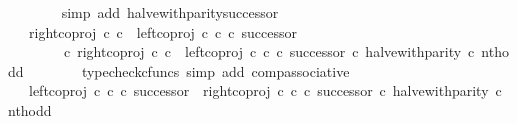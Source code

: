 \begin{isabellebody}
\ \ \ \ \ \ \isamarkupfalse%
\ {\isacharparenleft}{\kern0pt}simp\ add{\isacharcolon}{\kern0pt}\ halve{\isacharunderscore}{\kern0pt}with{\isacharunderscore}{\kern0pt}parity{\isacharunderscore}{\kern0pt}successor{\isacharparenright}{\kern0pt}\isanewline
\ \ \ \ \isamarkupfalse%
\ \isamarkupfalse%
\ {\isachardoublequoteopen}{\isachardot}{\kern0pt}{\isachardot}{\kern0pt}{\isachardot}{\kern0pt}\ {\isacharequal}{\kern0pt}\ {\isacharparenleft}{\kern0pt}right{\isacharunderscore}{\kern0pt}coproj\ {\isasymnat}\isactrlsub c\ {\isasymnat}\isactrlsub c\ {\isasymamalg}\ {\isacharparenleft}{\kern0pt}left{\isacharunderscore}{\kern0pt}coproj\ {\isasymnat}\isactrlsub c\ {\isasymnat}\isactrlsub c\ {\isasymcirc}\isactrlsub c\ successor{\isacharparenright}{\kern0pt}\isanewline
\ \ \ \ \ \ \ \ {\isasymcirc}\isactrlsub c\ right{\isacharunderscore}{\kern0pt}coproj\ {\isasymnat}\isactrlsub c\ {\isasymnat}\isactrlsub c\ {\isasymamalg}\ {\isacharparenleft}{\kern0pt}left{\isacharunderscore}{\kern0pt}coproj\ {\isasymnat}\isactrlsub c\ {\isasymnat}\isactrlsub c\ {\isasymcirc}\isactrlsub c\ successor{\isacharparenright}{\kern0pt}{\isacharparenright}{\kern0pt}\ {\isasymcirc}\isactrlsub c\ halve{\isacharunderscore}{\kern0pt}with{\isacharunderscore}{\kern0pt}parity\ {\isasymcirc}\isactrlsub c\ nth{\isacharunderscore}{\kern0pt}odd{\isachardoublequoteclose}\isanewline
\ \ \ \ \ \ \isamarkupfalse%
\ {\isacharparenleft}{\kern0pt}typecheck{\isacharunderscore}{\kern0pt}cfuncs{\isacharcomma}{\kern0pt}\ simp\ add{\isacharcolon}{\kern0pt}\ comp{\isacharunderscore}{\kern0pt}associative{}{\isacharparenright}{\kern0pt}\isanewline
\ \ \ \ \isamarkupfalse%
\ \isamarkupfalse%
\ {\isachardoublequoteopen}{\isachardot}{\kern0pt}{\isachardot}{\kern0pt}{\isachardot}{\kern0pt}\ {\isacharequal}{\kern0pt}\ {\isacharparenleft}{\kern0pt}{\isacharparenleft}{\kern0pt}left{\isacharunderscore}{\kern0pt}coproj\ {\isasymnat}\isactrlsub c\ {\isasymnat}\isactrlsub c\ {\isasymcirc}\isactrlsub c\ successor{\isacharparenright}{\kern0pt}\ {\isasymamalg}\ {\isacharparenleft}{\kern0pt}right{\isacharunderscore}{\kern0pt}coproj\ {\isasymnat}\isactrlsub c\ {\isasymnat}\isactrlsub c\ {\isasymcirc}\isactrlsub c\ successor{\isacharparenright}{\kern0pt}{\isacharparenright}{\kern0pt}\ {\isasymcirc}\isactrlsub c\ halve{\isacharunderscore}{\kern0pt}with{\isacharunderscore}{\kern0pt}parity\ {\isasymcirc}\isactrlsub c\ nth{\isacharunderscore}{\kern0pt}odd{\isachardoublequoteclose}\isanewline
\ \ \ \ \ \ \isamarkupfalse%

\end{isabellebody}
